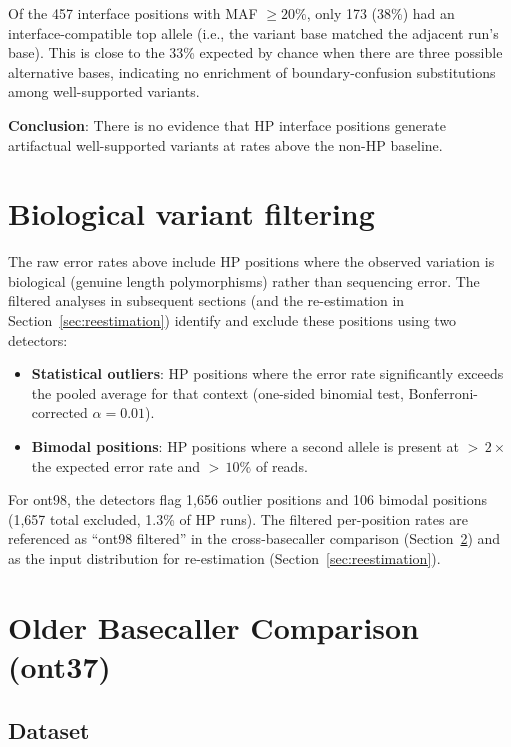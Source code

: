 \documentclass[11pt]{article}
\begin{document}
Of the 457 interface positions with MAF $\geq 20\%$, only 173 (38\%) had an
interface-compatible top allele (i.e., the variant base matched the adjacent
run's base). This is close to the 33\% expected by chance when there are three
possible alternative bases, indicating no enrichment of boundary-confusion
substitutions among well-supported variants.

\textbf{Conclusion}: There is no evidence that HP interface positions generate
artifactual well-supported variants at rates above the non-HP baseline.


\section{Biological variant filtering}
\label{sec:bio_filtering}

The raw error rates above include HP positions where the observed variation is
biological (genuine length polymorphisms) rather than sequencing error. The
filtered analyses in subsequent sections (and the re-estimation in
Section~\ref{sec:reestimation}) identify and exclude these positions using two
detectors:

\begin{itemize}
\item \textbf{Statistical outliers}: HP positions where the error rate
  significantly exceeds the pooled average for that context (one-sided binomial
  test, Bonferroni-corrected $\alpha = 0.01$).
\item \textbf{Bimodal positions}: HP positions where a second allele is present
  at ${>}\,2\times$ the expected error rate and ${>}\,10\%$ of reads.
\end{itemize}

For ont98, the detectors flag 1,656 outlier positions and 106 bimodal positions
(1,657 total excluded, 1.3\% of HP runs). The filtered per-position rates are
referenced as ``ont98 filtered'' in the cross-basecaller comparison
(Section~\ref{sec:older_basecaller}) and as the input distribution for
re-estimation (Section~\ref{sec:reestimation}).


\section{Older Basecaller Comparison (ont37)}
\label{sec:older_basecaller}

\subsection{Dataset}
\end{document}
